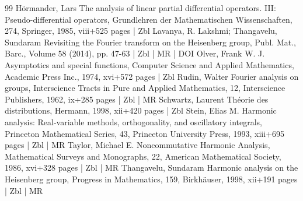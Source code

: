 \documentclass[10pt]{amsart}
\theoremstyle{definition}\newtheorem{defi}[theo]{Definition}\newtheorem{rema}[theo]{Remark}\newtheorem{exam}[theo]{Example}\newtheorem{exem}[theo]{Example}\newtheorem{nota}[theo]{Notation}
\begin{document}
\begin{thebibliography}{99}
Hörmander, Lars The analysis of linear partial differential operators. III: Pseudo-differential operators, Grundlehren der Mathematischen Wissenschaften, 274, Springer, 1985, viii+525 pages | Zbl
Lavanya, R. Lakshmi; Thangavelu, Sundaram Revisiting the Fourier transform on the Heisenberg group, Publ. Mat., Barc., Volume 58 (2014), pp. 47-63 | Zbl | MR | DOI
Olver, Frank W. J. Asymptotics and special functions, Computer Science and Applied Mathematics, Academic Press Inc., 1974, xvi+572 pages | Zbl
Rudin, Walter Fourier analysis on groups, Interscience Tracts in Pure and Applied Mathematics, 12, Interscience Publishers, 1962, ix+285 pages | Zbl | MR
Schwartz, Laurent Théorie des distributions, Hermann, 1998, xii+420 pages | Zbl
Stein, Elias M. Harmonic analysis: Real-variable methods, orthogonality, and oscillatory integrals, Princeton Mathematical Series, 43, Princeton University Press, 1993, xiii+695 pages | Zbl | MR
Taylor, Michael E. Noncommutative Harmonic Analysis, Mathematical Surveys and Monographs, 22, American Mathematical Society, 1986, xvi+328 pages | Zbl | MR
Thangavelu, Sundaram Harmonic analysis on the Heisenberg group, Progress in Mathematics, 159, Birkhäuser, 1998, xii+191 pages | Zbl | MR
\end{thebibliography}
\end{document}
